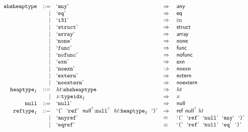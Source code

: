 $$
\begin{array}[t]{@{}lrrl@{}l@{}l@{}l@{}}
& {\mathtt{absheaptype}} & ::= & \mbox{‘\texttt{any}’} & \quad\Rightarrow\quad{} & \mathsf{any} \\
& & | & \mbox{‘\texttt{eq}’} & \quad\Rightarrow\quad{} & \mathsf{eq} \\
& & | & \mbox{‘\texttt{i31}’} & \quad\Rightarrow\quad{} & \mathsf{i{\scriptstyle 31}} \\
& & | & \mbox{‘\texttt{struct}’} & \quad\Rightarrow\quad{} & \mathsf{struct} \\
& & | & \mbox{‘\texttt{array}’} & \quad\Rightarrow\quad{} & \mathsf{array} \\
& & | & \mbox{‘\texttt{none}’} & \quad\Rightarrow\quad{} & \mathsf{none} \\
& & | & \mbox{‘\texttt{func}’} & \quad\Rightarrow\quad{} & \mathsf{func} \\
& & | & \mbox{‘\texttt{nofunc}’} & \quad\Rightarrow\quad{} & \mathsf{nofunc} \\
& & | & \mbox{‘\texttt{exn}’} & \quad\Rightarrow\quad{} & \mathsf{exn} \\
& & | & \mbox{‘\texttt{noexn}’} & \quad\Rightarrow\quad{} & \mathsf{noexn} \\
& & | & \mbox{‘\texttt{extern}’} & \quad\Rightarrow\quad{} & \mathsf{extern} \\
& & | & \mbox{‘\texttt{noextern}’} & \quad\Rightarrow\quad{} & \mathsf{noextern} \\
& {{\mathtt{heaptype}}}_{I} & ::= & {\mathit{ht}}{:}{\mathtt{absheaptype}} & \quad\Rightarrow\quad{} & {\mathit{ht}} \\
& & | & x{:}{{\mathtt{typeidx}}}_{I} & \quad\Rightarrow\quad{} & x \\
& {\mathtt{null}} & ::= & \mbox{‘\texttt{null}’} & \quad\Rightarrow\quad{} & \mathsf{null} \\
& {{\mathtt{reftype}}}_{I} & ::= & \mbox{‘\texttt{{(}}’}~~\mbox{‘\texttt{ref}’}~~{\mathsf{null}^?}{:}{{\mathtt{null}}^?}~~{\mathit{ht}}{:}{{\mathtt{heaptype}}}_{I}~~\mbox{‘\texttt{{)}}’} & \quad\Rightarrow\quad{} & \mathsf{ref}~{\mathsf{null}^?}~{\mathit{ht}} \\
& & | & \mbox{‘\texttt{anyref}’} & \quad\equiv\quad{} & \mbox{‘\texttt{{(}}’}~~\mbox{‘\texttt{ref}’}~~\mbox{‘\texttt{null}’}~~\mbox{‘\texttt{any}’}~~\mbox{‘\texttt{{)}}’} \\
& & | & \mbox{‘\texttt{eqref}’} & \quad\equiv\quad{} & \mbox{‘\texttt{{(}}’}~~\mbox{‘\texttt{ref}’}~~\mbox{‘\texttt{null}’}~~\mbox{‘\texttt{eq}’}~~\mbox{‘\texttt{{)}}’} \\

\end{array}$$
